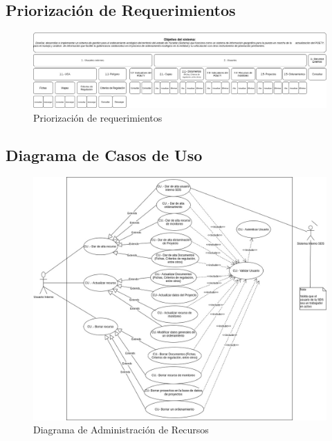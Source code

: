 \subsection{Priorización de Requerimientos}


\uselandscape
\begin{figure}[h]

\centering
\caption{Priorización de requerimientos}\label{fig:priorReq}
\includegraphics[width=1\textwidth, height=.5\textwidth]{images/PrioritizationRequirements}
\end{figure}
\useportrait

\restoregeometry

\uselandscape
\subsection{Diagrama de Casos de Uso}

\begin{figure}[h]

\centering
\includegraphics[width=1\textwidth, height=.39\textwidth]{images/AdminiInsumos}
\caption{Diagrama de Administración de Recursos}\label{fig:consumorec_cu_diag}

\end{figure}
\useportrait

